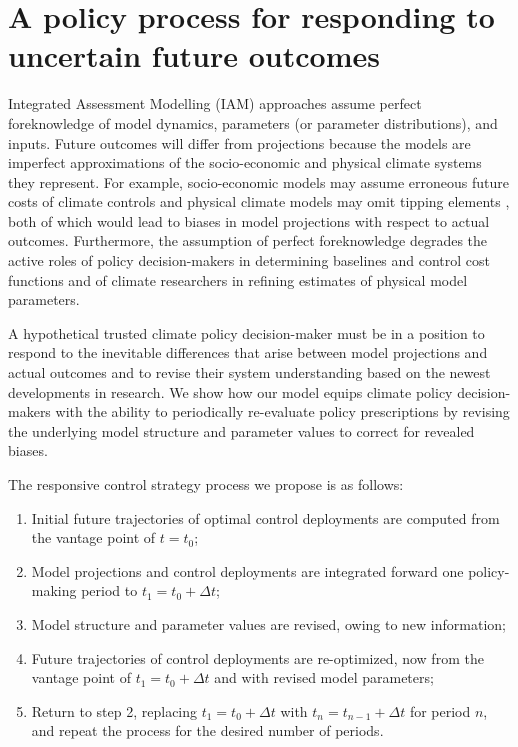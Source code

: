 \documentclass[9pt,twocolumn,twoside,lineno]{pnas-new}
\begin{document}
\section*{A policy process for responding to uncertain future outcomes}

Integrated Assessment Modelling (IAM) approaches assume perfect foreknowledge of model dynamics, parameters (or parameter distributions), and inputs. Future outcomes will differ from projections because the models are imperfect approximations of the socio-economic and physical climate systems they represent. For example, socio-economic models may assume erroneous future costs of climate controls and physical climate models may omit tipping elements \citep{steffen_trajectories_2018}, both of which would lead to biases in model projections with respect to actual outcomes. Furthermore, the assumption of perfect foreknowledge degrades the active roles of policy decision-makers in determining baselines and control cost functions and of climate researchers in refining estimates of physical model parameters.

A hypothetical trusted climate policy decision-maker must be in a position to respond to the inevitable differences that arise between model projections and actual outcomes and to revise their system understanding based on the newest developments in research. We show how our model equips climate policy decision-makers with the ability to periodically re-evaluate policy prescriptions by revising the underlying model structure and parameter values to correct for revealed biases.

The responsive control strategy process we propose is as follows:
\begin{enumerate}
    \item Initial future trajectories of optimal control deployments are computed from the vantage point of $t=t_{0}$;
    \item Model projections and control deployments are integrated forward one policy-making period to $t_{1}=t_{0} + \Delta t$;
    \item Model structure and parameter values are revised, owing to new information;
    \item Future trajectories of control deployments are re-optimized, now from the vantage point of $t_{1}=t_{0}+\Delta t$ and with revised model parameters;
    \item Return to step 2, replacing $t_{1} = t_{0} + \Delta t$ with $t_{n} = t_{n-1}+\Delta t$ for period $n$, and repeat the process for the desired number of periods.
\end{enumerate}
\end{document}
